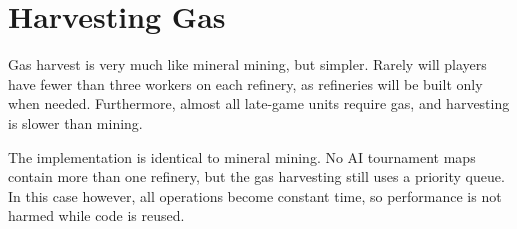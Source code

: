 \section{Harvesting Gas}	
Gas harvest is very much like mineral mining, but simpler. Rarely will players have fewer than three workers on each refinery, as refineries will be built only when needed. Furthermore, almost all late-game units require gas, and harvesting is slower than mining.

The implementation is identical to mineral mining. No AI tournament maps contain more than one refinery, but the gas harvesting still uses a priority queue. In this case however, all operations become constant time, so performance is not harmed while code is reused.